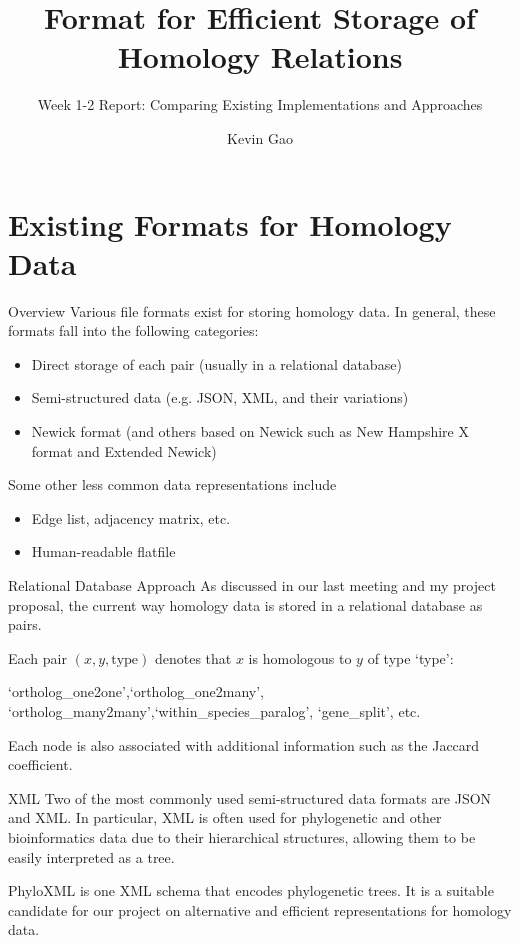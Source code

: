 \documentclass{beamer}
\title{Format for Efficient Storage of Homology Relations}
\subtitle{Week 1-2 Report: Comparing Existing Implementations and Approaches}
\author{Kevin Gao}
\institute{University of Toronto}
\begin{document}
\frame{\titlepage}


\section{Existing Formats for Homology Data}

\begin{frame}{Overview}
    Various file formats exist for storing homology data. In general, these formats fall into the following categories:

    \begin{itemize}
        \item Direct storage of each pair (usually in a relational database)
        \item Semi-structured data (e.g. JSON, XML, and their variations)
        \item Newick format (and others based on Newick such as New Hampshire X format and Extended Newick)
    \end{itemize}

    Some other less common data representations include
    \begin{itemize}
        \item Edge list, adjacency matrix, etc.
        \item Human-readable flatfile
    \end{itemize}
\end{frame}

\begin{frame}{Relational Database Approach}
    As discussed in our last meeting and my project proposal, the current way homology data is stored in a relational database as pairs.

    Each pair $(x,y,\text{type})$ denotes that $x$ is homologous to $y$ of type `type': 
    
    `ortholog\_one2one',`ortholog\_one2many',\\`ortholog\_many2many',`within\_species\_paralog', `gene\_split', etc.
    
    Each node is also associated with additional information such as the Jaccard coefficient.
\end{frame}

\begin{frame}{XML}
    Two of the most commonly used semi-structured data formats are JSON and XML. In particular, XML is often used for phylogenetic and other bioinformatics data due to their hierarchical structures, allowing them to be easily interpreted as a tree.

    PhyloXML is one XML schema that encodes phylogenetic trees. It is a suitable candidate for our project on alternative and efficient representations for homology data.
\end{frame}
\end{document}
